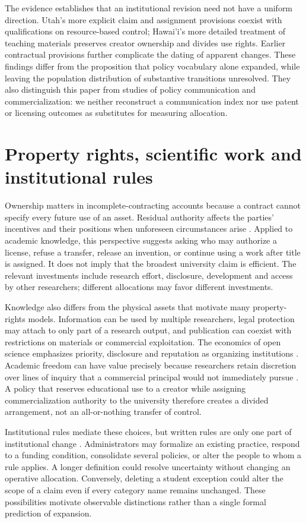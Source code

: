 \documentclass[12pt]{article}
\begin{document}
The evidence establishes that an institutional revision need not have a uniform direction. Utah's more explicit claim and assignment provisions coexist with qualifications on resource-based control; Hawai'i's more detailed treatment of teaching materials preserves creator ownership and divides use rights. Earlier contractual provisions further complicate the dating of apparent changes. These findings differ from the proposition that policy vocabulary alone expanded, while leaving the population distribution of substantive transitions unresolved. They also distinguish this paper from studies of policy communication and commercialization: we neither reconstruct a communication index nor use patent or licensing outcomes as substitutes for measuring allocation.

\section{Property rights, scientific work and institutional rules}
Ownership matters in incomplete-contracting accounts because a contract cannot specify every future use of an asset. Residual authority affects the parties' incentives and their positions when unforeseen circumstances arise \citep{grossman1986,hartmoore1990,hart1995}. Applied to academic knowledge, this perspective suggests asking who may authorize a license, refuse a transfer, release an invention, or continue using a work after title is assigned. It does not imply that the broadest university claim is efficient. The relevant investments include research effort, disclosure, development and access by other researchers; different allocations may favor different investments.

Knowledge also differs from the physical assets that motivate many property-rights models. Information can be used by multiple researchers, legal protection may attach to only part of a research output, and publication can coexist with restrictions on materials or commercial exploitation. The economics of open science emphasizes priority, disclosure and reputation as organizing institutions \citep{dasgupta1994}. Academic freedom can have value precisely because researchers retain discretion over lines of inquiry that a commercial principal would not immediately pursue \citep{aghion2008}. A policy that reserves educational use to a creator while assigning commercialization authority to the university therefore creates a divided arrangement, not an all-or-nothing transfer of control.

Institutional rules mediate these choices, but written rules are only one part of institutional change \citep{north1990}. Administrators may formalize an existing practice, respond to a funding condition, consolidate several policies, or alter the people to whom a rule applies. A longer definition could resolve uncertainty without changing an operative allocation. Conversely, deleting a student exception could alter the scope of a claim even if every category name remains unchanged. These possibilities motivate observable distinctions rather than a single formal prediction of expansion.
\end{document}
